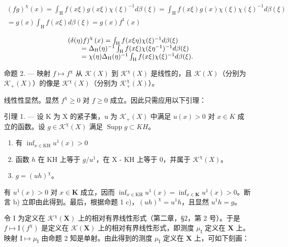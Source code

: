 \[
\begin{array}{c} (f g) ^ {\chi} (x) = \int_ {\mathrm{H}} f (x \xi) g (x \xi) \chi (\xi) ^ {- 1} d \beta (\xi) = \int_ {\mathrm{H}} f (x \xi) g (x) \chi (\xi) \chi (\xi) ^ {- 1} d \beta (\xi) \\ = g (x) \int_ {\mathrm{H}} f (x \xi) d \beta (\xi) = g (x) f ^ {1} (x) \end{array}
\]

\[
\begin{array}{r l} & {\left(\delta (\eta) f\right) ^ {\chi} (x) = \int_ {\mathrm{H}} f (x \xi \eta) \chi (\xi) ^ {- 1} d \beta (\xi)} \\ & {\qquad = \Delta_ {\mathrm{H}} (\eta) ^ {- 1} \int_ {\mathrm{H}} f (x \xi) \chi (\xi \eta^ {- 1}) ^ {- 1} d \beta (\xi)} \\ & {\qquad = \chi (\eta) \Delta_ {\mathrm{H}} (\eta) ^ {- 1} \int_ {\mathrm{H}} f (x \xi) \chi (\xi) ^ {- 1} d \beta (\xi).} \end{array}
\]

命题 2. --- 映射 \(f \mapsto f^{\chi}\) 从 \(\mathcal{K}(X)\) 到 \(\mathcal{K}^{\chi}(X)\) 是线性的，且 \(\mathcal{K}(X)\)（分别为 \(\mathcal{K}_{+}(X)\)）的像是 \(\mathcal{K}^{\chi}(X)\)（分别为 \(\mathcal{K}_{+}^{\chi}(X)\)）。

线性性显然。显然 \(f^{\chi} \geqslant 0\) 对 \(f \geqslant 0\) 成立。因此只需应用以下引理：

引理 1. --- 设 K 为 X 的紧子集，u 为 \(\mathcal{K}_{+}(X)\) 中满足 \(u(x) > 0\) 对 \(x \in K\) 成立的函数。设 \(g \in \mathcal{K}^{\chi}(X)\) 满足 \(\operatorname{Supp} g \subset KH\)。

\begin{enumerate}
\def\labelenumi{\alph{enumi})}
\item
有 \(\inf_{x\in \mathrm{KH}}u^1 (x) > 0\)
\item
函数 \(h\) 在 KH 上等于 \(g / u^1\)，在 X - KH 上等于 0，并属于 \(\mathcal{K}^{\chi}(X)\)。
\item
  \(g = (uh)^{\chi}\)。
\end{enumerate}

有 \(u^1(x) > 0\) 对 \(x \in \mathbf{K}\) 成立，因而 \(\inf_{x \in \mathrm{KH}} u^1(x) = \inf_{x \in \mathbf{K}} u^1(x) > 0\)。断言 b) 立即由此得到。最后，根据命题 1 c)，\((uh)^{\chi} = u^{1}h\)，且显然 \(u^1h = g\)。

令 I 为定义在 \(\mathcal{K}^{\chi}(\mathbf{X})\) 上的相对有界线性形式（第二章，§2，第 2 号）。于是 \(f \mapsto \mathrm{I}(f^{\chi})\) 是定义在 \(\mathcal{K}(\mathbf{X})\) 上的相对有界线性形式，即测度 \(\mu_{\mathrm{I}}\) 定义在 \(\mathbf{X}\) 上。映射 \(\mathrm{I} \mapsto \mu_{\mathrm{I}}\) 由命题 2 知是单射。由此得到的测度 \(\mu_{\mathrm{I}}\) 定义在 \(\mathbf{X}\) 上，可如下刻画：

